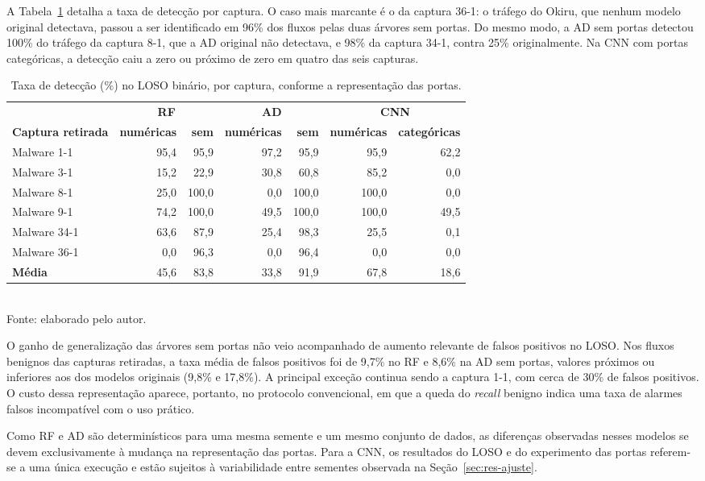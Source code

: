 A Tabela~\ref{tab:portas-loso} detalha a taxa de detecção por captura. O caso mais marcante é o da captura 36-1: o tráfego do Okiru, que nenhum modelo original detectava, passou a ser identificado em 96\% dos fluxos pelas duas árvores sem portas. Do mesmo modo, a AD sem portas detectou 100\% do tráfego da captura 8-1, que a AD original não detectava, e 98\% da captura 34-1, contra 25\% originalmente. Na CNN com portas categóricas, a detecção caiu a zero ou próximo de zero em quatro das seis capturas.

\begin{table}[htbp]
\centering
\caption{Taxa de detecção (\%) no LOSO binário, por captura, conforme a representação das portas.}
\label{tab:portas-loso}
\small
\begin{tabular}{lrrrrrr}
\toprule
 & \multicolumn{2}{c}{\textbf{RF}} & \multicolumn{2}{c}{\textbf{AD}} & \multicolumn{2}{c}{\textbf{CNN}} \\
\cmidrule(lr){2-3} \cmidrule(lr){4-5} \cmidrule(lr){6-7}
\textbf{Captura retirada} & \textbf{numéricas} & \textbf{sem} & \textbf{numéricas} & \textbf{sem} & \textbf{numéricas} & \textbf{categóricas} \\
\midrule
Malware 1-1  & 95,4 & 95,9  & 97,2 & 95,9  & 95,9  & 62,2 \\
Malware 3-1  & 15,2 & 22,9  & 30,8 & 60,8  & 85,2  &  0,0 \\
Malware 8-1  & 25,0 & 100,0 &  0,0 & 100,0 & 100,0 &  0,0 \\
Malware 9-1  & 74,2 & 100,0 & 49,5 & 100,0 & 100,0 & 49,5 \\
Malware 34-1 & 63,6 & 87,9  & 25,4 & 98,3  & 25,5  &  0,1 \\
Malware 36-1 &  0,0 & 96,3  &  0,0 & 96,4  &  0,0  &  0,0 \\
\midrule
\textbf{Média} & 45,6 & 83,8 & 33,8 & 91,9 & 67,8 & 18,6 \\
\bottomrule
\end{tabular}
\\[2pt]
\small{Fonte: elaborado pelo autor.}
\end{table}

O ganho de generalização das árvores sem portas não veio acompanhado de aumento relevante de falsos positivos no LOSO. Nos fluxos benignos das capturas retiradas, a taxa média de falsos positivos foi de 9,7\% no RF e 8,6\% na AD sem portas, valores próximos ou inferiores aos dos modelos originais (9,8\% e 17,8\%). A principal exceção continua sendo a captura 1-1, com cerca de 30\% de falsos positivos. O custo dessa representação aparece, portanto, no protocolo convencional, em que a queda do \textit{recall} benigno indica uma taxa de alarmes falsos incompatível com o uso prático.

Como RF e AD são determinísticos para uma mesma semente e um mesmo conjunto de dados, as diferenças observadas nesses modelos se devem exclusivamente à mudança na representação das portas. Para a CNN, os resultados do LOSO e do experimento das portas referem-se a uma única execução e estão sujeitos à variabilidade entre sementes observada na Seção~\ref{sec:res-ajuste}.
